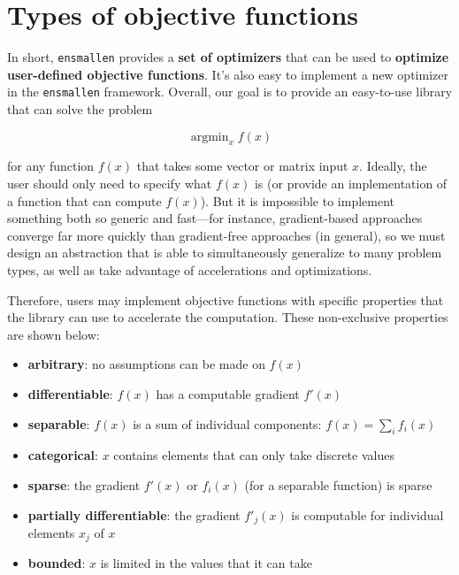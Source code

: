 \documentclass{article}
\begin{document}
\section{Types of objective functions}

In short, {\tt ensmallen} provides a {\bf set of optimizers} that can be used to
{\bf optimize user-defined objective functions}.  It's also easy to implement a
new optimizer in the {\tt ensmallen} framework.  Overall, our goal is to provide
an easy-to-use library that can solve the problem

\begin{equation}
\operatorname{argmin}_{x} f(x)
\end{equation}

\noindent for any function $f(x)$ that takes some vector or matrix input $x$.  Ideally,
the user should only need to specify what $f(x)$ is (or provide an
implementation of a function that can compute $f(x)$).  But it is impossible to
implement something both so generic and fast---for instance, gradient-based
approaches converge far more quickly than gradient-free approaches (in general),
so we must design an abstraction that is able to simultaneously generalize to
many problem types, as well as take advantage of accelerations and
optimizations.

Therefore, users may implement objective functions with specific properties that
the library can use to accelerate the computation.  These non-exclusive
properties are shown below:

\begin{itemize}
  \item {\bf arbitrary}: no assumptions can be made on $f(x)$
  \item {\bf differentiable}: $f(x)$ has a computable gradient $f'(x)$
  \item {\bf separable}: $f(x)$ is a sum of individual components: $f(x) =
\sum_{i} f_i(x)$
  \item {\bf categorical}: $x$ contains elements that can only take discrete
values
  \item {\bf sparse}: the gradient $f'(x)$ or $f_i(x)$ (for a separable
function) is sparse
  \item {\bf partially differentiable}: the gradient $f'_j(x)$ is computable for
individual elements $x_j$ of $x$
  \item {\bf bounded}: $x$ is limited in the values that it can take
\end{itemize}
\end{document}
